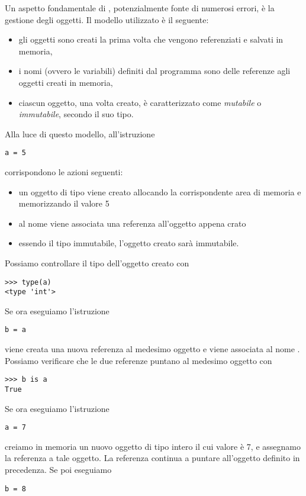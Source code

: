 Un aspetto fondamentale di \python, potenzialmente fonte di numerosi errori,
\`e la gestione degli oggetti. Il modello utilizzato \`e il seguente:
\begin{itemize}
  \item gli oggetti sono creati la prima volta che vengono referenziati e
    salvati in memoria,
  \item i nomi (ovvero le variabili) definiti dal programma sono delle
    referenze agli oggetti creati in memoria,
  \item ciascun oggetto, una volta creato, \`e caratterizzato come
    \emph{mutabile} o
    \emph{immutabile}, secondo il suo tipo.
\end{itemize}
Alla luce di questo modello, all'istruzione
\begin{verbatim}
a = 5
\end{verbatim}
corrispondono le azioni seguenti:
\begin{itemize}
  \item un oggetto di tipo  viene creato allocando la
    corrispondente area di memoria e memorizzando il valore 5
  \item al nome  viene associata una referenza all'oggetto
    appena crato
  \item essendo il tipo  immutabile, l'oggetto creato sar\`a
    immutabile.
\end{itemize}
Possiamo controllare il tipo dell'oggetto creato con
\begin{verbatim}
>>> type(a)
<type 'int'>
\end{verbatim}
Se ora eseguiamo l'istruzione
\begin{verbatim}
b = a
\end{verbatim}
viene creata una nuova referenza al medesimo oggetto e viene associata al nome
. Possiamo verificare che le due referenze puntano al medesimo oggetto
con
\begin{verbatim}
>>> b is a
True
\end{verbatim}
Se ora eseguiamo l'istruzione
\begin{verbatim}
a = 7
\end{verbatim}
creiamo in memoria un nuovo oggetto di tipo intero il cui valore \`e 7,
e assegnamo la referenza  a tale oggetto. La referenza  continua
a puntare all'oggetto definito in precedenza. Se poi eseguiamo
\begin{verbatim}
b = 8
\end{verbatim}
